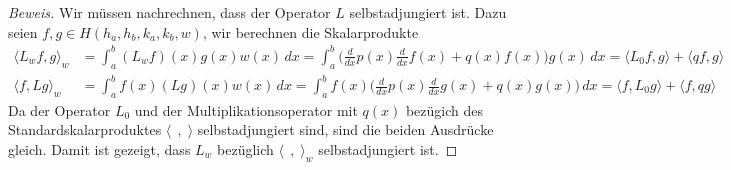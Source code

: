 \begin{proof}[Beweis]
Wir müssen nachrechnen, dass der Operator $L$ selbstadjungiert ist.
Dazu seien $f,g\in H(h_a,h_b,k_a,k_b,w)$, wir berechnen die
Skalarprodukte
\begin{align*}
\langle L_wf,g\rangle_w
&=
\int_a^b (L_wf)(x)g(x)w(x)\,dx
=
\int_a^b
\biggl(
\frac{d}{dx}p(x)\frac{d}{dx}f(x) + 
q(x) f(x)
\biggr) g(x)\,dx
=
\langle L_0f,g\rangle + \langle qf,g\rangle
\\
\langle f,Lg\rangle_w
&=
\int_a^b f(x)(Lg)(x)w(x)\,dx
=
\int_a^b
f(x)
\biggl(
\frac{d}{dx}p(x)\frac{d}{dx}g(x) + 
q(x) g(x)
\biggr) \,dx
=
\langle f,L_0g\rangle + \langle f,qg\rangle
\end{align*}
Da der Operator $L_0$ und der Multiplikationsoperator mit $q(x)$ bezügich
des Standardskalarproduktes $\langle\;\,,\;\rangle$ selbstadjungiert sind,
sind die beiden Ausdrücke gleich.
Damit ist gezeigt, dass $L_w$ bezüglich $\langle\;\,,\;\rangle_w$
selbstadjungiert ist.
\end{proof}
